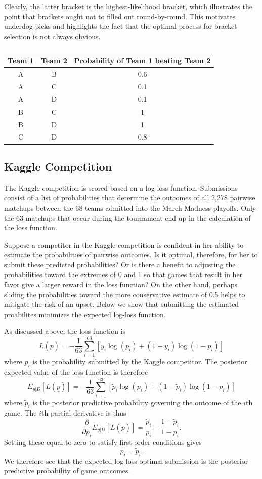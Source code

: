 \documentclass[11pt]{article} %
\begin{document}
Clearly, the latter bracket is the highest-likelihood bracket, which illustrates the point that brackets ought not to filled out round-by-round. This motivates underdog picks and highlights the fact that the optimal process for bracket selection is not always obvious.

\begin{table}
	\centering
	\begin{tabular}{|cc|c|}
		\hline
		Team 1	&	Team 2	&	Probability of Team 1 beating Team 2 \\
		\hline
		A 		&	B 		&	0.6\\
		A 		&	C 		& 	0.1\\
		A 		& 	D 		& 	0.1\\
		B 		&	C 		&	1\\
		B 		& 	D 		&	1\\
		C 		& 	D 		& 	0.8\\
		\hline
	\end{tabular}
	\caption{\label{tab:hypothetical}}
\end{table}

\subsection{Kaggle Competition}

The Kaggle competition is scored based on a log-loss function. Submissions consist of a list of probabilities that determine the outcomes of all 2,278 pairwise matchups between the 68 teams admitted into the March Madness playoffs. Only the 63 matchups that occur during the tournament end up in the calculation of the loss function.

Suppose a competitor in the Kaggle competition is confident in her ability to estimate the probabilities of pairwise outcomes. Is it optimal, therefore, for her to submit these predicted probabilities? Or is there a benefit to adjusting the probabilities toward the extremes of 0 and 1 so that games that result in her favor give a larger reward in the loss function? On the other hand, perhaps sliding the probabilities toward the more conservative estimate of 0.5 helps to mitigate the risk of an upset. Below we show that submitting the estimated proabilites minimizes the expected log-loss function. 

As discussed above, the loss function is 
$$
L(\underline{p})=-\frac{1}{63}\sum_{i=1}^{63}\left[y_i\log(p_i)+(1-y_i)\log(1-p_i)\right]
$$
where $p_i$ is the probability submitted by the Kaggle competitor. The posterior expected value of the loss function is therefore 
$$
E_{y|D}[L(\underline{p})]=-\frac{1}{63}\sum_{i=1}^{63}\left[\tilde{p}_i\log(p_i)+(1-\tilde{p}_i)\log(1-p_i)\right]
$$
where $\tilde{p}_i$ is the posterior predictive probability governing the outcome of the $i$th game. The $i$th partial derivative is thus
$$
\frac{\partial}{\partial p_i} E_{y|D}[L(\underline{p})] = \frac{\tilde{p}_i}{p_i}-\frac{1-\tilde{p}_i}{1-p_i}.
$$
Setting these equal to zero to satisfy first order conditions gives
$$
p_i=\tilde{p}_i.
$$
We therefore see that the expected log-loss optimal submission is the posterior predictive probability of game outcomes.
\end{document}
